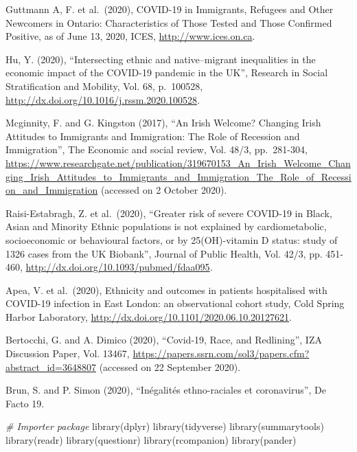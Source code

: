 \documentclass[
]{article}
\newenvironment{Shaded}{\begin{snugshade}}{\end{snugshade}}
\newcommand{\CommentTok}[1]{\textcolor[rgb]{0.56,0.35,0.01}{\textit{#1}}}
\newcommand{\FunctionTok}[1]{\textcolor[rgb]{0.00,0.00,0.00}{#1}}
\newcommand{\NormalTok}[1]{#1}
\begin{document}
Guttmann A, F. et al.~(2020), COVID-19 in Immigrants, Refugees and Other
Newcomers in Ontario: Characteristics of Those Tested and Those Confirmed
Positive, as of June 13, 2020, ICES, \url{http://www.ices.on.ca}.

Hu, Y. (2020), ``Intersecting ethnic and native--migrant inequalities in the
economic impact of the COVID-19 pandemic in the UK'', Research in Social
Stratification and Mobility, Vol. 68, p.~100528,
\url{http://dx.doi.org/10.1016/j.rssm.2020.100528}.

Mcginnity, F. and G. Kingston (2017), ``An Irish Welcome? Changing Irish
Attitudes to Immigrants and Immigration: The Role of Recession and Immigration'',
The Economic and social review, Vol. 48/3, pp.~281-304,
\url{https://www.researchgate.net/publication/319670153_An_Irish_Welcome_Changing_Irish_Attitudes_to_Immigrants_and_Immigration_The_Role_of_Recession_and_Immigration}
(accessed on 2 October 2020).

Raisi-Estabragh, Z. et al.~(2020), ``Greater risk of severe COVID-19 in Black,
Asian and Minority Ethnic populations is not explained by cardiometabolic,
socioeconomic or behavioural factors, or by 25(OH)-vitamin D status: study of
1326 cases from the UK Biobank'', Journal of Public Health, Vol. 42/3, pp.
451-460, \url{http://dx.doi.org/10.1093/pubmed/fdaa095}.

Apea, V. et al.~(2020), Ethnicity and outcomes in patients hospitalised with
COVID-19 infection in East London: an observational cohort study, Cold Spring
Harbor Laboratory, \url{http://dx.doi.org/10.1101/2020.06.10.20127621}.

Bertocchi, G. and A. Dimico (2020), ``Covid-19, Race, and Redlining'', IZA
Discussion Paper, Vol. 13467,
\url{https://papers.ssrn.com/sol3/papers.cfm?abstract_id=3648807} (accessed on 22
September 2020).

Brun, S. and P. Simon (2020), ``Inégalités ethno-raciales et coronavirus'', De
Facto 19.

\begin{Shaded}
\begin{Highlighting}[]
\CommentTok{\# Importer package}
\FunctionTok{library}\NormalTok{(dplyr)}
\FunctionTok{library}\NormalTok{(tidyverse)}
\FunctionTok{library}\NormalTok{(summarytools)}
\FunctionTok{library}\NormalTok{(readr)}
\FunctionTok{library}\NormalTok{(questionr)}
\FunctionTok{library}\NormalTok{(rcompanion)}
\FunctionTok{library}\NormalTok{(pander)}
\end{Highlighting}
\end{Shaded}
\end{document}

